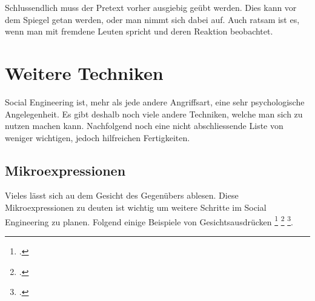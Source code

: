 Schlussendlich muss der Pretext vorher ausgiebig geübt werden. Dies kann vor dem Spiegel getan werden, oder man nimmt sich dabei auf. Auch ratsam ist es, wenn man mit fremdene Leuten spricht und deren Reaktion beobachtet.

\section{Weitere Techniken}
Social Engineering ist, mehr als jede andere Angriffsart, eine sehr psychologische Angelegenheit. Es gibt deshalb noch viele andere Techniken, welche man sich zu nutzen machen kann. Nachfolgend noch eine nicht abschliessende Liste von weniger wichtigen, jedoch hilfreichen Fertigkeiten.

\subsection{Mikroexpressionen}
Vieles lässt sich au dem Gesicht des Gegenübers ablesen. Diese Mikroexpressionen zu deuten ist wichtig um weitere Schritte im Social Engineering zu planen.
Folgend einige Beispiele von Gesichtsausdrücken
\footcite{Anger_by_kwerfeldein_on_DeviantArt_2015-05-16}
\footcite{Ekman_-_Facial_Expressions_Foreign_Language_Flashcards_-_Cramcom_2015-05-16}
\footcite{Facial_expression_project_-_laughing_girls__Flickr_-_Photo_Sharing_2015-05-16}.

